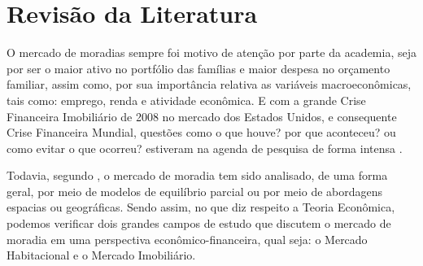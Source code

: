 \section{Revisão da Literatura}


O mercado de moradias sempre foi motivo de atenção por parte da academia, seja por ser o maior ativo no portfólio das famílias e maior despesa no orçamento familiar, assim como, por sua importância relativa as variáveis macroeconômicas, tais como: emprego, renda e atividade econômica. E com a grande Crise Financeira Imobiliário de 2008 no mercado dos Estados Unidos, e consequente Crise Financeira Mundial,  questões como o que houve? por que aconteceu? ou como evitar o que ocorreu? estiveram na agenda de pesquisa de forma intensa \cite{Davis2015}. 

Todavia, segundo , o mercado de moradia tem sido analisado, de uma forma geral, por meio de modelos de equilíbrio parcial ou por meio de abordagens espacias ou geográficas. Sendo assim, no que diz respeito a Teoria Econômica, podemos verificar dois grandes campos de estudo que discutem o mercado de moradia em uma perspectiva econômico-financeira, qual seja: o Mercado Habitacional e o Mercado Imobiliário. %



